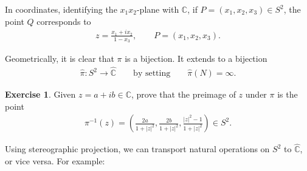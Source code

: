 \documentclass[11pt]{article}
\theoremstyle{plain}
\theoremstyle{definition}
\newtheorem{exercise}[theorem]{Exercise}
\theoremstyle{remark}
\numberwithin{equation}{section}
\newcommand{\be}{\begin{eqnarray}}
\newcommand{\ee}{\end{eqnarray}}
\newcommand{\C}{\mathbb{C}}
\begin{document}
In coordinates,  identifying the $x_1x_2$-plane with $\C$, if $P=(x_1, x_2, x_3) \in S^2$, the point $Q$ corresponds to
\be
\boxed{\displaystyle
	z=\frac{x_1+i x_2}{1-x_3}
},
\qquad P=(x_1,x_2,x_3).
\ee

Geometrically, it is clear that $\pi$ is a bijection.  It extends to a
bijection
\be
\widehat{\pi}:S^2\longrightarrow\widehat{\C}
\qquad\text{by setting}\qquad
\widehat{\pi}(N)=\infty.
\ee

\begin{exercise}
Given $z=a+ib\in\C$, prove that the preimage of $z$ under $\pi$ is the
point
\be
  \pi^{-1}(z)
  =\left(
    \frac{2a}{1+|z|^2},
    \frac{2b}{1+|z|^2},
    \frac{|z|^2-1}{1+|z|^2}
  \right)\in S^2.
\ee
\end{exercise}

Using stereographic projection, we can transport natural operations on
$S^2$ to $\widehat{\C}$, or vice versa.  For example:
\end{document}
